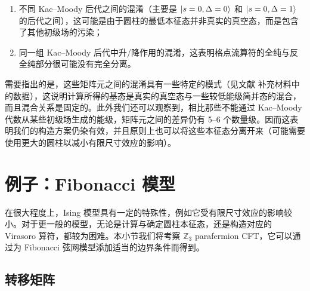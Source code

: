 \begin{enumerate}
  \item 不同 Kac--Moody 后代之间的混淆（主要是 $\ket{s=0,\Delta=0}$ 和 $\ket{s=0,\Delta=1}$ 的后代之间），这可能是由于圆柱的最低本征态并非真实的真空态，而是包含了其他初级场的污染；
  \item 同一组 Kac--Moody 后代中升/降作用的混淆，这表明格点流算符的全纯与反全纯部分很可能没有完全分离。
\end{enumerate}

需要指出的是，这些矩阵元之间的混淆具有一些特定的模式（见文献 \parencite{wang2022virasoro} 补充材料中的数据），这说明计算所得的基态是真实的真空态与一些较低能级简并态的混合，而且混合关系是固定的。此外我们还可以观察到，相比那些不能通过 Kac--Moody 代数从某些初级场生成的能级，矩阵元之间的差异仍有 5--6 个数量级。因而这表明我们的构造方案仍染有效，并且原则上也可以将这些本征态分离开来（可能需要使用更大的圆柱以减小有限尺寸效应的影响）。

\section{例子：Fibonacci 模型}

在很大程度上，Ising 模型具有一定的特殊性，例如它受有限尺寸效应的影响较小。对于更一般的模型，无论是计算与确定圆柱本征态，还是构造对应的 Virasoro 算符，都较为困难。本小节我们将考察 $\mathbb{Z}_3$ parafermion CFT，它可以通过为 Fibonacci 弦网模型添加适当的边界条件而得到。

\subsection{转移矩阵}

